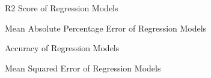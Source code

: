 \documentclass{article}
\begin{document}
  

  



\begin{figure}[h]  
    \centering  
      
    \caption{R2 Score of Regression Models}  
    \label{fig:r2_score}  
\end{figure}  

\begin{figure}[h]  
    \centering  
      
    \caption{Mean Absolute Percentage Error of Regression Models}  
    \label{fig:mape}  
\end{figure}  

\begin{figure}[h]  
    \centering  
      
    \caption{Accuracy of Regression Models}  
    \label{fig:accuracy}  
\end{figure}  

\begin{figure}[h]  
    \centering  
      
    \caption{Mean Squared Error of Regression Models}  
    \label{fig:mse}  
\end{figure}
\end{document}

